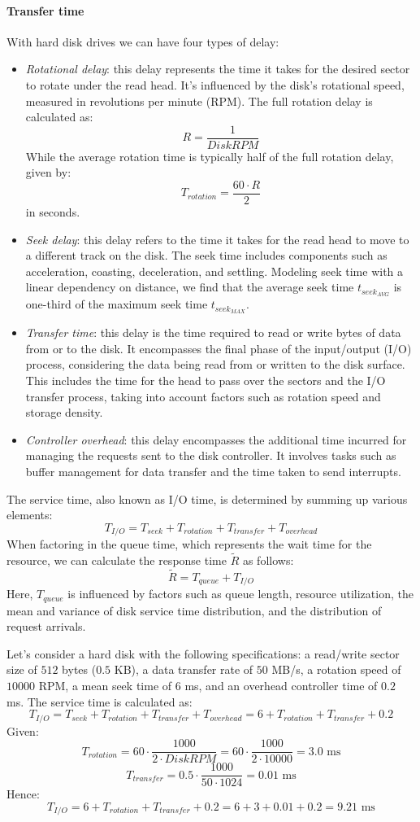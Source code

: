 \paragraph*{Transfer time}
With hard disk drives we can have four types of delay: 
\begin{itemize}
    \item \textit{Rotational delay}: this delay represents the time it takes for the desired sector to rotate under the read head. 
        It's influenced by the disk's rotational speed, measured in revolutions per minute (RPM).
        The full rotation delay is calculated as: 
        \[R=\dfrac{1}{DiskRPM}\]
        While the average rotation time is typically half of the full rotation delay, given by: 
        \[T_{rotation}=\dfrac{60\cdot R}{2}\]
        in seconds.
    \item \textit{Seek delay}: this delay refers to the time it takes for the read head to move to a different track on the disk. 
        The seek time includes components such as acceleration, coasting, deceleration, and settling. 
        Modeling seek time with a linear dependency on distance, we find that the average seek time $t_{seek_{AVG}}$ is one-third of the maximum seek time $t_{seek_{MAX}}$. 
    \item \textit{Transfer time}: this delay is the time required to read or write bytes of data from or to the disk. 
        It encompasses the final phase of the input/output (I/O) process, considering the data being read from or written to the disk surface. 
        This includes the time for the head to pass over the sectors and the I/O transfer process, taking into account factors such as rotation speed and storage density.
    \item \textit{Controller overhead}: this delay encompasses the additional time incurred for managing the requests sent to the disk controller.
        It involves tasks such as buffer management for data transfer and the time taken to send interrupts.
\end{itemize}
The service time, also known as I/O time, is determined by summing up various elements:
\[T_{I/O}=T_{seek}+T_{rotation}+T_{transfer}+T_{overhead}\]
When factoring in the queue time, which represents the wait time for the resource, we can calculate the response time $\tilde{R}$ as follows:
\[\tilde{R}=T_{queue}+T_{I/O}\]
Here, $T_{queue}$ is influenced by factors such as queue length, resource utilization, the mean and variance of disk service time distribution, and the distribution of request arrivals.
\begin{example}
    Let's consider a hard disk with the following specifications: a read/write sector size of $512$ bytes ($0.5$ KB), a data transfer rate of $50$ MB/s, a rotation speed of $10000$ RPM, a mean seek time of $6$ ms, and an overhead controller time of $0.2$ ms.
    The service time is calculated as:
    \[T_{I/O}=T_{seek}+T_{rotation}+T_{transfer}+T_{overhead}=6+T_{rotation}+T_{transfer}+0.2\]
    Given:
    \[T_{rotation}=60\cdot\dfrac{1000}{2 \cdot DiskRPM}=60\cdot\dfrac{1000}{2 \cdot 10000}=3.0\text{ ms}\]
    \[T_{transfer}=0.5\cdot\dfrac{1000}{50 \cdot 1024}=0.01\text{ ms}\]
    Hence:
    \[T_{I/O}=6+T_{rotation}+T_{transfer}+0.2=6+3+0.01+0.2=9.21\text{ ms}\]
\end{example}
